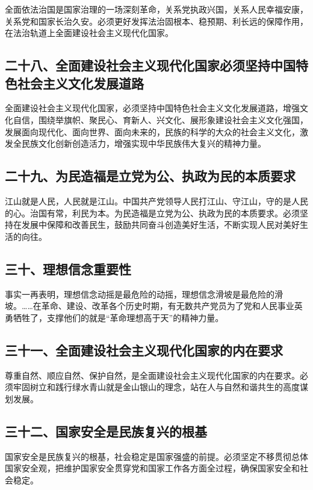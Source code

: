 \documentclass[UTF8,11pt,a4paper]{ctexart}
\begin{document}
全面依法治国是国家治理的一场深刻革命，关系党执政兴国，关系人民幸福安康，关系党和国家长治久安。必须更好发挥法治固根本、稳预期、利长远的保障作用，在法治轨道上全面建设社会主义现代化国家。

\subsection*{二十八、全面建设社会主义现代化国家必须坚持中国特色社会主义文化发展道路}

全面建设社会主义现代化国家，必须坚持中国特色社会主义文化发展道路，增强文化自信，围绕举旗帜、聚民心、育新人、兴文化、展形象建设社会主义文化强国，发展面向现代化、面向世界、面向未来的，民族的科学的大众的社会主义文化，激发全民族文化创新创造活力，增强实现中华民族伟大复兴的精神力量。

\subsection*{二十九、为民造福是立党为公、执政为民的本质要求}

江山就是人民，人民就是江山。中国共产党领导人民打江山、守江山，守的是人民的心。治国有常，利民为本。为民造福是立党为公、执政为民的本质要求。必须坚持在发展中保障和改善民生，鼓励共同奋斗创造美好生活，不断实现人民对美好生活的向往。

\subsection*{三十、理想信念重要性}

事实一再表明，理想信念动摇是最危险的动摇，理想信念滑坡是最危险的滑坡。……在革命、建设、改革各个历史时期，有无数共产党员为了党和人民事业英勇牺牲了，支撑他们的就是“革命理想高于天”的精神力量。

\subsection*{三十一、全面建设社会主义现代化国家的内在要求}

尊重自然、顺应自然、保护自然，是全面建设社会主义现代化国家的内在要求。必须牢固树立和践行绿水青山就是金山银山的理念，站在人与自然和谐共生的高度谋划发展。

\subsection*{三十二、国家安全是民族复兴的根基}

国家安全是民族复兴的根基，社会稳定是国家强盛的前提。必须坚定不移贯彻总体国家安全观，把维护国家安全贯穿党和国家工作各方面全过程，确保国家安全和社会稳定。
\end{document}
